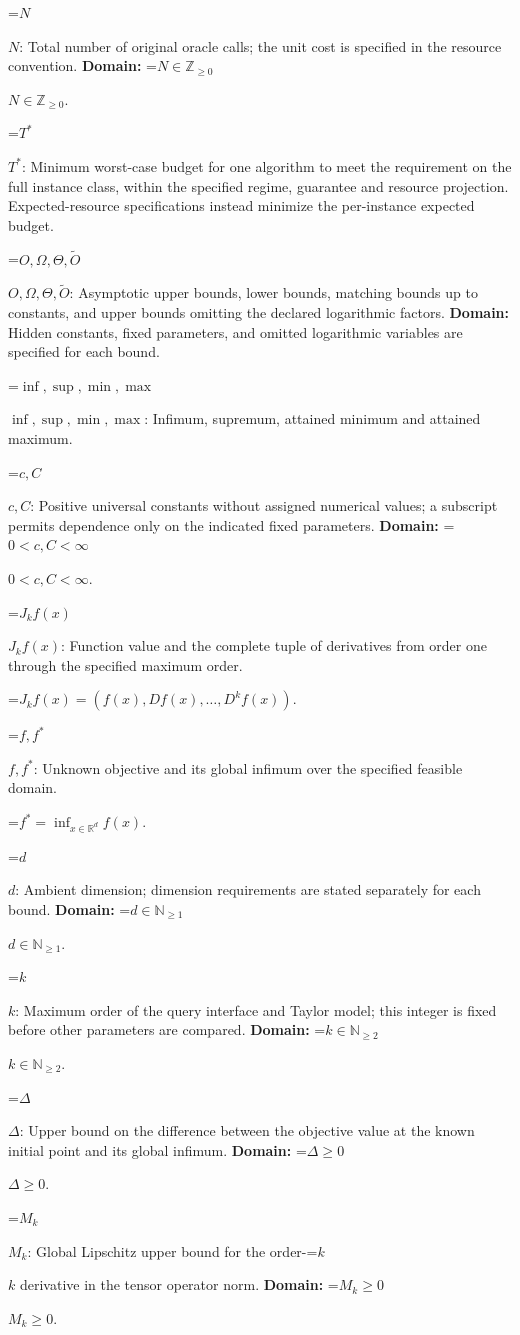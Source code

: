 \documentclass[10pt,a4paper]{article}
\newcommand{\AtlasMath}[1]{\par\begingroup\centering\setbox0=\hbox{$\displaystyle #1$}\ifdim\wd0>1.4\linewidth\typeout{ATLAS WIDE FORMULA: \the\wd0}\fi\ifdim\wd0>\linewidth\resizebox{\linewidth}{!}{\box0}\else\box0\fi\par\endgroup}
\newcommand{\AtlasInlineMath}[1]{\begingroup\setbox0=\hbox{$#1$}\ifdim\wd0>.4\linewidth\endgroup\AtlasMath{#1}\else\endgroup$#1$\fi}
\begin{document}
\AtlasInlineMath{N}: Total number of original oracle calls; the unit cost is specified in the resource convention. \textbf{Domain:} \AtlasInlineMath{N\in\mathbb{Z}_{\ge0}}.

\AtlasInlineMath{T^*}: Minimum worst-case budget for one algorithm to meet the requirement on the full instance class, within the specified regime, guarantee and resource projection. Expected-resource specifications instead minimize the per-instance expected budget.

\AtlasInlineMath{O,\Omega,\Theta,\widetilde{O}}: Asymptotic upper bounds, lower bounds, matching bounds up to constants, and upper bounds omitting the declared logarithmic factors. \textbf{Domain:} Hidden constants, fixed parameters, and omitted logarithmic variables are specified for each bound.

\AtlasInlineMath{\inf,\sup,\min,\max}: Infimum, supremum, attained minimum and attained maximum.

\AtlasInlineMath{c,C}: Positive universal constants without assigned numerical values; a subscript permits dependence only on the indicated fixed parameters. \textbf{Domain:} \AtlasInlineMath{0<c,C<\infty}.

\AtlasInlineMath{J_{k}f(x)}: Function value and the complete tuple of derivatives from order one through the specified maximum order.


\AtlasMath{J_{k}f(x)=(f(x),Df(x),\ldots,D^{k}f(x)).}


\AtlasInlineMath{f,f^*}: Unknown objective and its global infimum over the specified feasible domain.


\AtlasMath{f^*=\inf_{x\in \mathbb{R}^d}f(x).}


\AtlasInlineMath{d}: Ambient dimension; dimension requirements are stated separately for each bound. \textbf{Domain:} \AtlasInlineMath{d\in\mathbb{N}_{\ge1}}.

\AtlasInlineMath{k}: Maximum order of the query interface and Taylor model; this integer is fixed before other parameters are compared. \textbf{Domain:} \AtlasInlineMath{k\in\mathbb{N}_{\ge2}}.

\AtlasInlineMath{\Delta}: Upper bound on the difference between the objective value at the known initial point and its global infimum. \textbf{Domain:} \AtlasInlineMath{\Delta\ge0}.

\AtlasInlineMath{M_k}: Global Lipschitz upper bound for the order-\AtlasInlineMath{k} derivative in the tensor operator norm. \textbf{Domain:} \AtlasInlineMath{M_k\ge0}.
\end{document}
